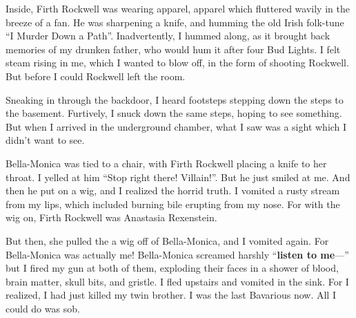 Inside, Firth Rockwell was wearing apparel, apparel which fluttered
wavily in the breeze of a fan. He was sharpening a knife, and
humming the old Irish folk-tune ``I Murder Down a Path''.
Inadvertently, I hummed along, as it brought back memories of my
drunken father, who would hum it after four Bud Lights. I felt
steam rising in me, which I wanted to blow off, in the form of
shooting Rockwell. But before I could Rockwell left the room.



Sneaking in through the backdoor, I heard footsteps stepping down
the steps to the basement. Furtively, I snuck down the same steps,
hoping to see something. But when I arrived in the underground
chamber, what I saw was a sight which I didn't want to see.



Bella-Monica was tied to a chair, with Firth Rockwell placing a
knife to her throat. I yelled at him ``Stop right there!
Villain!''. But he just smiled at me. And then he put on a
wig, and I realized the horrid truth. I vomited a rusty stream from
my lips, which included burning bile erupting from my nose. For
with the wig on, Firth Rockwell was Anastasia Rexenstein.



But then, she pulled the a wig off of Bella-Monica, and I vomited
again. For Bella-Monica was actually me! Bella-Monica screamed
harshly ``{\bf listen to me}---'' but I fired my gun at both of them,
exploding their faces in a shower of blood, brain matter, skull
bits, and gristle. I fled upstairs and vomited in the sink. For I
realized, I had just killed my twin brother. I was the last
Bavarious now. All I could do was sob. 

 






